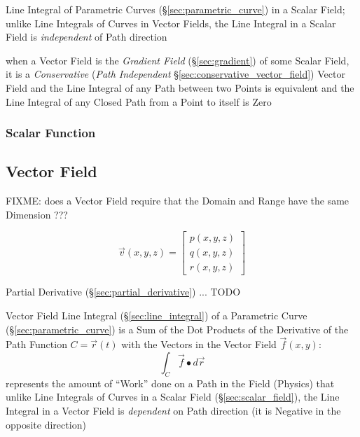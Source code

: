 Line Integral of Parametric Curves (\S\ref{sec:parametric_curve}) in a Scalar
Field; unlike Line Integrals of Curves in Vector Fields, the Line Integral in a
Scalar Field is \emph{independent} of Path direction

when a Vector Field is the \emph{Gradient Field} (\S\ref{sec:gradient}) of some
Scalar Field, it is a \emph{Conservative} (\emph{Path Independent}
\S\ref{sec:conservative_vector_field}) Vector Field and the Line Integral of
any Path between two Points is equivalent and the Line Integral of any Closed
Path from a Point to itself is Zero



\subsubsection{Scalar Function}\label{sec:scalar_function}



\subsection{Vector Field}\label{sec:vector_field}

FIXME: does a Vector Field require that the Domain and Range have the same
Dimension ???

\begin{equation*}
  \vec{v}(x,y,z) = \begin{bmatrix}
    p(x,y,z) \\
    q(x,y,z) \\
    r(x,y,z)
  \end{bmatrix}
\end{equation*}

Partial Derivative (\S\ref{sec:partial_derivative}) ... TODO

Vector Field Line Integral (\S\ref{sec:line_integral}) of a Parametric Curve
(\S\ref{sec:parametric_curve}) is a Sum of the Dot Products of the Derivative
of the Path Function $C = \vec{r}(t)$ with the Vectors in the Vector Field
$\vec{f}(x,y)$:
\[
  \int_C \vec{f} \bullet d\vec{r}
\]
represents the amount of ``Work'' done on a Path in the Field (Physics)
that unlike Line Integrals of Curves in a Scalar Field
(\S\ref{sec:scalar_field}), the Line Integral in a Vector Field is
\emph{dependent} on Path direction (it is Negative in the opposite direction)

